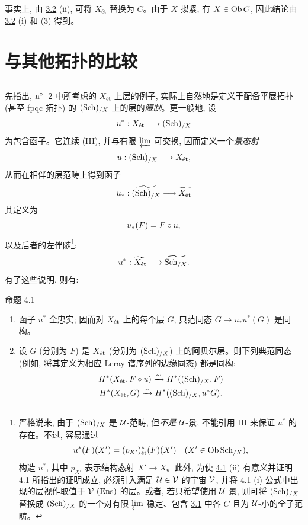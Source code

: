 事实上, 由 \hyperref[VII.cor3.2]{3.2} (ii), 可将 $X_{\text{ét}}$ 替换为 $C$。由于 $X$ 拟紧, 有 $X\in\operatorname{Ob} C$, 因此结论由 \hyperref[VII.cor3.2]{3.2} (i) 和  (3) 得到。

\section{与其他拓扑的比较}

\setcounter{subsection}{-1}
\subsection{}

先指出, ${\rm n^{\circ}}$~2 中所考虑的 $X_{\text{ét}}$ 上层的例子, 实际上自然地是定义于配备平展拓扑 (甚至 fpqc 拓扑) 的 $(\operatorname{Sch})_{/X}$ 上的层\pageoriginale 的\emph{限制}。更一般地, 设
$$
u^{\ast} : X_{\text{ét}} \to (\Sch)_{/X}
$$
为包含函子。它连续 (III), 并与有限 $\varprojlim$ 可交换, 因而定义一个\emph{景态射}
$$
u : (\Sch)_{/X} \to X_{\text{ét}}{\quoi},
$$
从而在相伴的层范畴上得到函子
$$
u_{\ast} : \widetilde{(\Sch)_{/X}} \to \widetilde{X_{\text{ét}}}
$$
其定义为
$$
u_{\ast}(F)=F\circ u{},
$$
以及后者的左伴随\footnote{严格说来, 由于 $(\operatorname{Sch})_{/X}$ 是 ${\mathcal U}$-范畴, 但\emph{不是} ${\mathcal U}$-景, 不能引用 III 来保证 $u^{\ast}$ 的存在。不过, 容易通过
$$
u^{\ast} (F) (X') = (p_{X'})^{\ast}_{\text{ét}} (F) (X')\quad (X'\in \operatorname{Ob} \operatorname{Sch}_{/X}){},
$$
构造 $u^{\ast}$, 其中 $p_{X'}$ 表示结构态射 $X'\to X$。此外, 为使 \hyperref[VII.prop4.1]{4.1} (ii) 有意义并证明 \hyperref[VII.prop4.1]{4.1} 所指出的证明成立, 必须引入满足 ${\mathcal U}\in{\mathcal V}$ 的宇宙 ${\mathcal V}$, 并将 \hyperref[VII.prop4.1]{4.1} (i) 公式中出现的层视作取值于 ${\mathcal V}\text{-}(\operatorname{Ens})$ 的层。或者, 若只希望使用 ${\mathcal U}$-景, 则可将 $(\operatorname{Sch})_{/X}$ 替换成 $(\operatorname{Sch})_{/X}$ 的一个对有限 $\varprojlim$ 稳定、包含 \hyperref[VII.prop3.1]{3.1} 中各 $C$ 且为 ${\mathcal U}$-小的全子范畴。}:
$$
u^{\ast} : \widetilde{X_{\text{ét}}} \to \widetilde{\Sch_{/X}}.
$$
有了这些说明, 则有:

\begin{enonce*}{命题 4.1}
\begin{enumerate}
\renewcommand{\theenumi}{\roman{enumi}}
\renewcommand{\labelenumi}{(\theenumi)}
\item 函子 $u^{\ast}$ 全忠实; 因而对 $X_{\text{\rm ét}}$ 上的每个层 $G$, 典范同态 $G\to u_{\ast}u^{\ast}(G)$ 是同构。

\item 设 $G$ (分别为 $F$) 是 $X_{\text{\rm ét}}$ (分别为 $(\operatorname{Sch})_{/X}$) 上的阿贝尔层。则下列典范同态 (例如, 将其定义为相应 Leray 谱序列的边缘同态) 都是同构:\pageoriginale
\begin{gather*}
H^{\ast} (X_{\text{\rm ét}}, F \circ u) \xrightarrow{\sim} H^{\ast}((\operatorname{Sch})_{/X}, F)\\
H^{\ast} (X_{\text{\rm ét}}, G) \xrightarrow{\sim} H^{\ast}((\operatorname{Sch})_{/X}, u^{\ast}G){}.
\end{gather*}
\end{enumerate}

\end{enonce*}

